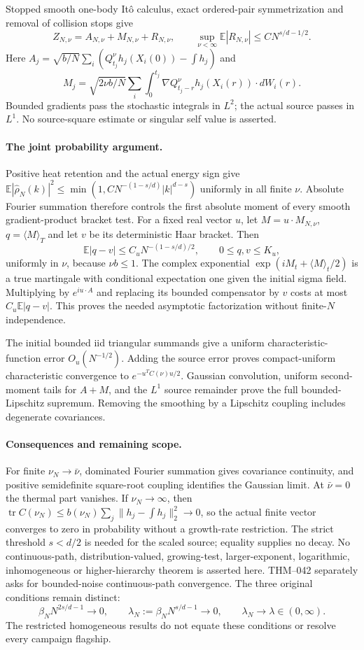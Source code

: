 \documentclass[10pt]{article}
\newcommand{\E}{\mathbb E}
\begin{document}
Stopped smooth one-body It\^o calculus, exact ordered-pair symmetrization and removal of collision stops give
\[
 Z_{N,\nu}=A_{N,\nu}+M_{N,\nu}+R_{N,\nu},
 \qquad \sup_{\nu<\infty}\E|R_{N,\nu}|\le CN^{s/d-1/2}.
\]
Here $A_j=\sqrt{b/N}\sum_i(Q_{t_j}^\nu h_j(X_i(0))-\int h_j)$ and
\[
 M_j=\sqrt{2\nu b/N}\sum_i\int_0^{t_j}
              \nabla Q_{t_j-r}^\nu h_j(X_i(r))\cdot dW_i(r).
\]
Bounded gradients pass the stochastic integrals in $L^2$; the actual source passes in $L^1$. No source-square estimate or singular self value is asserted.

\paragraph{The joint probability argument.}
Positive heat retention and the actual energy sign give
$\E|\widehat\rho_N(k)|^2\le\min(1,CN^{-(1-s/d)}|k|^{d-s})$ uniformly in all finite $\nu$. Absolute Fourier summation therefore controls the first absolute moment of every smooth gradient-product bracket test. For a fixed real vector $u$, let $M=u\cdot M_{N,\nu}$, $q=\langle M\rangle_T$ and let $v$ be its deterministic Haar bracket. Then
\[
 \E|q-v|\le C_uN^{-(1-s/d)/2},\qquad 0\le q,v\le K_u,
\]
uniformly in $\nu$, because $\nu b\le1$. The complex exponential
$\exp(iM_t+\langle M\rangle_t/2)$ is a true martingale with conditional expectation one given the initial sigma field. Multiplying by $e^{iu\cdot A}$ and replacing its bounded compensator by $v$ costs at most $C_u\E|q-v|$. This proves the needed asymptotic factorization without finite-$N$ independence.

The initial bounded iid triangular summands give a uniform characteristic-function error $O_u(N^{-1/2})$. Adding the source error proves compact-uniform characteristic convergence to $e^{-u^TC(\nu)u/2}$. Gaussian convolution, uniform second-moment tails for $A+M$, and the $L^1$ source remainder prove the full bounded-Lipschitz supremum. Removing the smoothing by a Lipschitz coupling includes degenerate covariances.

\paragraph{Consequences and remaining scope.}
For finite $\nu_N\to\bar\nu$, dominated Fourier summation gives covariance continuity, and positive semidefinite square-root coupling identifies the Gaussian limit. At $\bar\nu=0$ the thermal part vanishes. If $\nu_N\to\infty$, then
$\operatorname{tr}C(\nu_N)\le b(\nu_N)\sum_j\|h_j-\int h_j\|_2^2\to0$,
so the actual finite vector converges to zero in probability without a growth-rate restriction.
The strict threshold $s<d/2$ is needed for the scaled source; equality supplies no decay. No continuous-path, distribution-valued, growing-test, larger-exponent, logarithmic, inhomogeneous or higher-hierarchy theorem is asserted here. THM--042 separately asks for bounded-noise continuous-path convergence.
The three original conditions remain distinct:
\[
 \beta_NN^{2s/d-1}\to0,\qquad
 \lambda_N:=\beta_NN^{s/d-1}\to0,\qquad
 \lambda_N\to\lambda\in(0,\infty).
\]
The restricted homogeneous results do not equate these conditions or resolve every campaign flagship.
\end{document}
